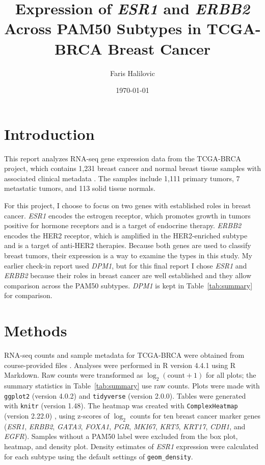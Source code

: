 \documentclass[11pt]{article}
\title{Expression of \textit{ESR1} and \textit{ERBB2} Across PAM50 Subtypes in TCGA-BRCA Breast Cancer}
\author{Faris Halilovic}
\date{\today}
\begin{document}
\maketitle

\section{Introduction}
This report analyzes RNA-seq gene expression data from the TCGA-BRCA project, which contains 1,231 breast cancer and normal breast tissue samples with associated clinical metadata \cite{tcga2012,grossman2016}. The samples include 1,111 primary tumors, 7 metastatic tumors, and 113 solid tissue normals. 

For this project, I choose to focus on two genes with established roles in breast cancer. \textit{ESR1} encodes the estrogen receptor, which promotes growth in tumors positive for hormone receptors and is a target of endocrine therapy. \textit{ERBB2} encodes the HER2 receptor, which is amplified in the HER2-enriched subtype and is a target of anti-HER2 therapies. Because both genes are used to classify breast tumors, their expression is a way to examine the types in this study. My earlier check-in report used \textit{DPM1}, but for this final report I chose \textit{ESR1} and \textit{ERBB2} because their roles in breast cancer are well established and they allow comparison across the PAM50 subtypes. \textit{DPM1} is kept in Table~\ref{tab:summary} for comparison.

\section{Methods}
RNA-seq counts and sample metadata for TCGA-BRCA were obtained from course-provided files \cite{courseData}. Analyses were performed in R version 4.4.1 using R Markdown. Raw counts were transformed as $\log_2(\text{count}+1)$ for all plots; the summary statistics in Table~\ref{tab:summary} use raw counts. Plots were made with \texttt{ggplot2} (version 4.0.2) \cite{wickham2016} and \texttt{tidyverse} (version 2.0.0). Tables were generated with \texttt{knitr} (version 1.48). The heatmap was created with \texttt{ComplexHeatmap} (version 2.22.0) \cite{gu2016,guBook}, using z-scores of $\log_2$ counts for ten breast cancer marker genes (\textit{ESR1}, \textit{ERBB2}, \textit{GATA3}, \textit{FOXA1}, \textit{PGR}, \textit{MKI67}, \textit{KRT5}, \textit{KRT17}, \textit{CDH1}, and \textit{EGFR}). Samples without a PAM50 label were excluded from the box plot, heatmap, and density plot. Density estimates of \textit{ESR1} expression were calculated for each subtype using the default settings of \texttt{geom\_density}.
\end{document}
